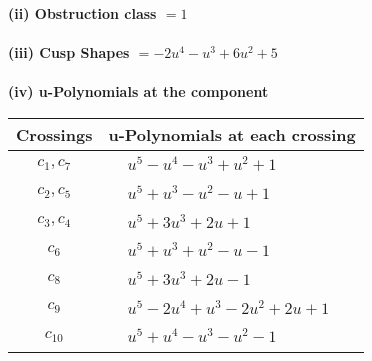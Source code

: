 \documentclass[1p]{elsarticle_modified}
\theoremstyle{definition}
\begin{document}
\flushleft \textbf{(ii) Obstruction class $= 1$}\\~\\
\flushleft \textbf{(iii) Cusp Shapes $= -2 u^4- u^3+6 u^2+5$}\\~\\
\newpage\renewcommand{\arraystretch}{1}
\flushleft \textbf{(iv) u-Polynomials at the component}\newline \\
\begin{tabular}{m{50pt}|m{274pt}}
Crossings & \hspace{64pt}u-Polynomials at each crossing \\
\hline $$\begin{aligned}c_{1},c_{7}\end{aligned}$$&$\begin{aligned}
&u^5- u^4- u^3+u^2+1
\end{aligned}$\\
\hline $$\begin{aligned}c_{2},c_{5}\end{aligned}$$&$\begin{aligned}
&u^5+u^3- u^2- u+1
\end{aligned}$\\
\hline $$\begin{aligned}c_{3},c_{4}\end{aligned}$$&$\begin{aligned}
&u^5+3 u^3+2 u+1
\end{aligned}$\\
\hline $$\begin{aligned}c_{6}\end{aligned}$$&$\begin{aligned}
&u^5+u^3+u^2- u-1
\end{aligned}$\\
\hline $$\begin{aligned}c_{8}\end{aligned}$$&$\begin{aligned}
&u^5+3 u^3+2 u-1
\end{aligned}$\\
\hline $$\begin{aligned}c_{9}\end{aligned}$$&$\begin{aligned}
&u^5-2 u^4+u^3-2 u^2+2 u+1
\end{aligned}$\\
\hline $$\begin{aligned}c_{10}\end{aligned}$$&$\begin{aligned}
&u^5+u^4- u^3- u^2-1
\end{aligned}$\\
\hline
\end{tabular}\\~\\
\end{document}
